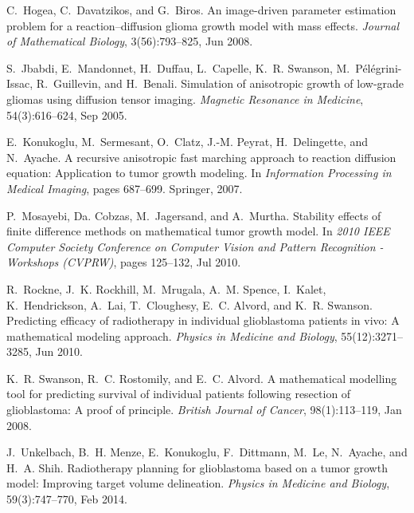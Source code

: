 
\begin{DoxyDescription}
\item[\label{citelist_CITEREF_hogea_2008}%
\Hypertarget{citelist_CITEREF_hogea_2008}%
\mbox{[}1\mbox{]}]C.~Hogea, C.~Davatzikos, and G.~Biros. An image-\/driven parameter estimation problem for a reaction--diffusion glioma growth model with mass effects. {\itshape Journal of Mathematical Biology}, 3(56)\+:793--825, Jun 2008.


\item[\label{citelist_CITEREF_jbabdi_2005}%
\Hypertarget{citelist_CITEREF_jbabdi_2005}%
\mbox{[}2\mbox{]}]S.~Jbabdi, E.~Mandonnet, H.~Duffau, L.~Capelle, K.~R. Swanson, M.~P\'{e}l\'{e}grini-\/\+Issac, R.~Guillevin, and H.~Benali. Simulation of anisotropic growth of low-\/grade gliomas using diffusion tensor imaging. {\itshape Magnetic Resonance in Medicine}, 54(3)\+:616--624, Sep 2005.


\item[\label{citelist_CITEREF_konukoglu_2007}%
\Hypertarget{citelist_CITEREF_konukoglu_2007}%
\mbox{[}3\mbox{]}]E.~Konukoglu, M.~Sermesant, O.~Clatz, J.-\/M. Peyrat, H.~Delingette, and N.~Ayache. A recursive anisotropic fast marching approach to reaction diffusion equation\+: Application to tumor growth modeling. In {\itshape Information Processing in Medical Imaging}, pages 687--699. Springer, 2007.


\item[\label{citelist_CITEREF_mosayebi_2010}%
\Hypertarget{citelist_CITEREF_mosayebi_2010}%
\mbox{[}4\mbox{]}]P.~Mosayebi, Da. Cobzas, M.~Jagersand, and A.~Murtha. Stability effects of finite difference methods on mathematical tumor growth model. In {\itshape 2010 I\+E\+EE Computer Society Conference on Computer Vision and Pattern Recognition -\/ Workshops (C\+V\+P\+RW)}, pages 125--132, Jul 2010.


\item[\label{citelist_CITEREF_rockne_2010}%
\Hypertarget{citelist_CITEREF_rockne_2010}%
\mbox{[}5\mbox{]}]R.~Rockne, J.~K. Rockhill, M.~Mrugala, A.~M. Spence, I.~Kalet, K.~Hendrickson, A.~Lai, T.~Cloughesy, E.~C. Alvord, and K.~R. Swanson. Predicting efficacy of radiotherapy in individual glioblastoma patients in vivo\+: A mathematical modeling approach. {\itshape Physics in Medicine and Biology}, 55(12)\+:3271--3285, Jun 2010.


\item[\label{citelist_CITEREF_swanson_2008}%
\Hypertarget{citelist_CITEREF_swanson_2008}%
\mbox{[}6\mbox{]}]K.~R. Swanson, R.~C. Rostomily, and E.~C. Alvord. A mathematical modelling tool for predicting survival of individual patients following resection of glioblastoma\+: A proof of principle. {\itshape British Journal of Cancer}, 98(1)\+:113--119, Jan 2008.


\item[\label{citelist_CITEREF_unkelbach_2014}%
\Hypertarget{citelist_CITEREF_unkelbach_2014}%
\mbox{[}7\mbox{]}]J.~Unkelbach, B.~H. Menze, E.~Konukoglu, F.~Dittmann, M.~Le, N.~Ayache, and H.~A. Shih. Radiotherapy planning for glioblastoma based on a tumor growth model\+: Improving target volume delineation. {\itshape Physics in Medicine and Biology}, 59(3)\+:747--770, Feb 2014.


\end{DoxyDescription}